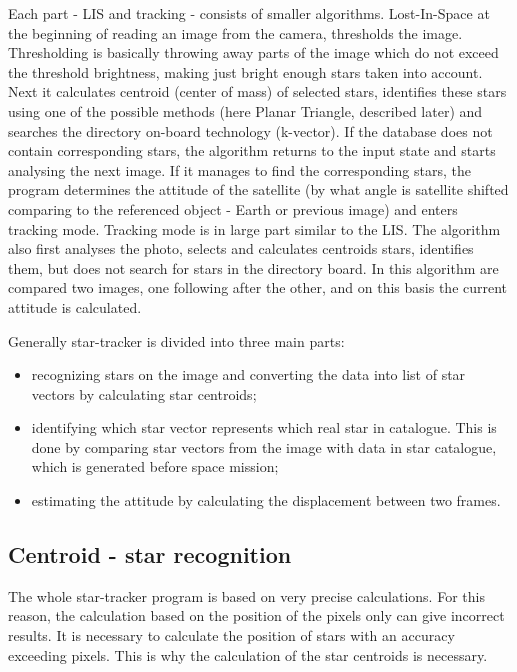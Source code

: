 \documentclass[12pt,a4paper,oneside]{article}
\begin{document}
Each part - LIS and tracking - consists of smaller algorithms. Lost-In-Space at the beginning of reading an image from the camera, thresholds the image. Thresholding is basically throwing away parts of the image which do not exceed the threshold brightness, making just bright enough stars taken into account. Next it calculates centroid (center of mass) of selected stars, identifies these stars using one of the possible methods (here Planar Triangle, described later) and searches the directory on-board technology (k-vector).
If the database does not contain corresponding stars, the algorithm returns to the input state and starts analysing the next image. If it manages to find the corresponding stars, the program determines the attitude of the satellite (by what angle is satellite shifted comparing to the referenced object - Earth or previous image) and enters tracking mode. Tracking mode is in large part similar to the LIS. The algorithm also first analyses the photo, selects and calculates centroids stars, identifies them, but does not search for stars in the directory board. In this algorithm are compared two images, one following after the other, and on this basis the current attitude is calculated.

Generally star-tracker is divided into three main parts\citet{mcbryde2012star}:
\begin{itemize}
\item recognizing stars on the image and converting the data into list of star vectors by calculating star centroids;
\item identifying which star vector represents which real star in catalogue. This is done by comparing star vectors from the image with data in star catalogue, which is generated before space mission;
\item estimating the attitude by calculating the displacement between two frames.
\end{itemize}

\subsection{Centroid - star recognition}

The whole star-tracker program is based on very precise calculations. For this reason, the calculation based on the position of the pixels only can give incorrect results. It is necessary to calculate the position of stars with an accuracy exceeding pixels. This is why the calculation of the star centroids is necessary.
\end{document}
